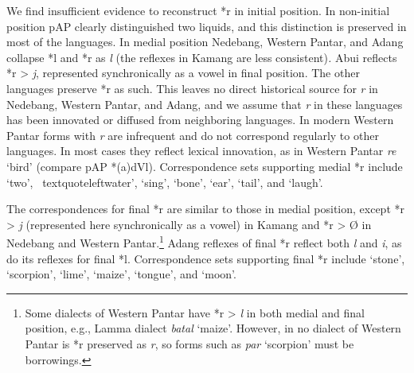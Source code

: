 We find insufficient evidence to reconstruct *r in initial position. In non-initial position pAP clearly distinguished two liquids, and this distinction is preserved in most of the languages. In medial position Nedebang, Western Pantar, and Adang collapse *l and *r as \textit{l }(the reflexes in Kamang are less consistent)\textit{. }Abui reflects *r {\textgreater} \textit{j}, represented synchronically as a vowel in final position. The other languages preserve *r as such. This leaves no direct historical source for \textit{r} in Nedebang, Western Pantar, and Adang, and we assume that \textit{r }in these languages has been innovated or diffused from neighboring languages. In modern Western Pantar forms with \textit{r} are infrequent and do not correspond regularly to other languages. In most cases they reflect lexical innovation, as in Western Pantar \textit{re }{\textquoteleft}bird{\textquoteright} (compare pAP *(a)dVl). Correspondence sets supporting medial *r include {\textquoteleft}two{\textquoteright}, {\
textquoteleft}water{\textquoteright}, {\textquoteleft}sing{\textquoteright}, {\textquoteleft}bone{\textquoteright}, {\textquoteleft}ear{\textquoteright}, {\textquoteleft}tail{\textquoteright}, and {\textquoteleft}laugh{\textquoteright}. 

 The correspondences for final *r are similar to those in medial position, except *r {\textgreater} \textit{j} (represented here synchronically as a vowel) in Kamang and *r {\textgreater} {\O} in Nedebang and Western Pantar.\footnote{ Some dialects of Western Pantar have *r {\textgreater} \textit{l} in both medial and final position, e.g., Lamma dialect \textit{bat{\textlengthmark}al }{\textquoteleft}maize{\textquoteright}. However, in no dialect of Western Pantar is *r preserved as \textit{r}, so forms such as \textit{par} {\textquoteleft}scorpion{\textquoteright} must be borrowings.} Adang reflexes of final *r reflect both \textit{l} and \textit{i}, as do its reflexes for final *l. Correspondence sets supporting final *r include {\textquoteleft}stone{\textquoteright}, {\textquoteleft}scorpion{\textquoteright}, {\textquoteleft}lime{\textquoteright}, {\textquoteleft}maize{\textquoteright}, {\textquoteleft}tongue{\textquoteright}, and {\textquoteleft}moon{\textquoteright}. 

